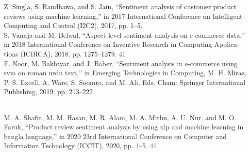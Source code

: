 \documentclass[conference]{IEEEtran}
\begin{document}
\begin{thebibliography}{00}
Z. Singla, S. Randhawa, and S. Jain, “Sentiment analysis of customer product
reviews using machine learning,” in 2017 International Conference on Intelligent
Computing and Control (I2C2), 2017, pp. 1–5.
\\
S. Vanaja and M. Belwal, “Aspect-level sentiment analysis on e-commerce data,”
in 2018 International Conference on Inventive Research in Computing Applica-
tions (ICIRCA), 2018, pp. 1275–1279.
41
\\
 F. Noor, M. Bakhtyar, and J. Baber, “Sentiment analysis in e-commerce using
svm on roman urdu text,” in Emerging Technologies in Computing, M. H. Miraz,
P. S. Excell, A. Ware, S. Soomro, and M. Ali, Eds. Cham: Springer International
Publishing, 2019, pp. 213–222

\\

 M. A. Shafin, M. M. Hasan, M. R. Alam, M. A. Mithu, A. U. Nur, and M. O.
Faruk, “Product review sentiment analysis by using nlp and machine learning
in bangla language,” in 2020 23rd International Conference on Computer and
Information Technology (ICCIT), 2020, pp. 1–5.
41




\end{thebibliography}


\vspace{12pt}
\end{document}
